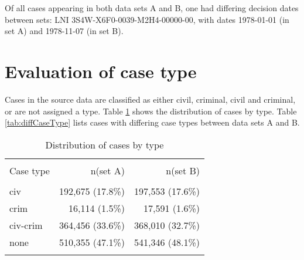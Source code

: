 \documentclass[10pt, letterpaper]{article}
\begin{document}
\begin{spacing}{1.0}

Of all cases appearing in both data sets A and B, one had differing decision dates between sets: LNI 3S4W-X6F0-0039-M2H4-00000-00, with dates 1978-01-01 (in set A) and 1978-11-07 (in set B).


\clearpage

\section{Evaluation of case type}

Cases in the source data are classified as either civil, criminal, civil and criminal, or are not assigned a type.  Table \ref{tab:distCaseType} shows the distribution of cases by type.  Table \ref{tab:diffCaseType} lists cases with differing case types between data sets A and B.

\vspace{20pt}

\begin{table}[H]
    \centering
    \caption{Distribution of cases by type}
    \begin{tabular}{lrr}
        \hline\\[-6pt]
        Case type & n(set A) & n(set B)\\[4pt]
        \hline\\[-6pt]
        civ & 192,675 (17.8\%) & 197,553 (17.6\%)\\
        crim &  16,114 (1.5\%) &  17,591 (1.6\%)\\
        civ-crim & 364,456 (33.6\%) & 368,010 (32.7\%)\\
        none & 510,355 (47.1\%) & 541,346 (48.1\%)\\
        \hline\\
    \end{tabular}
    \label{tab:distCaseType}
\end{table}

\vspace{20pt}


\end{spacing}
\end{document}
